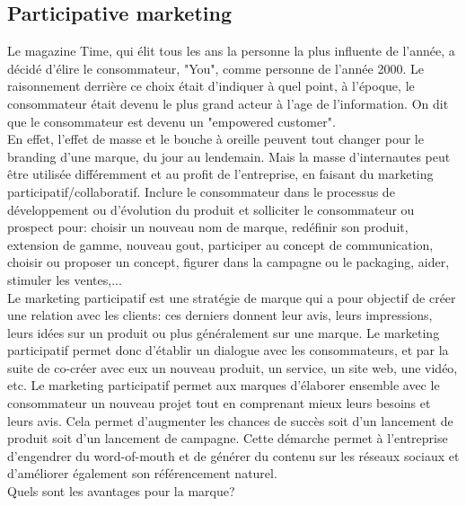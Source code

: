 \vspace{-1.2cm}

\subsection{Participative marketing}

Le magazine Time, qui élit tous les ans la personne la plus influente de l'année, a décidé d'élire le consommateur, "You", comme personne de l'année 2000. Le raisonnement derrière ce choix était d'indiquer à quel point, à l'époque, le consommateur était devenu le plus grand acteur à l'age de l'information. On dit que le consommateur est devenu un "empowered customer".\\

En effet, l'effet de masse et le bouche à oreille peuvent tout changer pour le branding d'une marque, du jour au lendemain. Mais la masse d'internautes peut être utilisée différemment et au profit de l'entreprise, en faisant du marketing participatif/collaboratif. Inclure le consommateur dans le processus de développement ou d'évolution du produit et solliciter le consommateur ou prospect pour: choisir un nouveau nom de marque, redéfinir son produit, extension de gamme, nouveau gout, participer au concept de communication, choisir ou proposer un concept, figurer dans la campagne ou le packaging, aider, stimuler les ventes,...\\

Le marketing participatif est une stratégie de marque qui a pour objectif de créer une relation avec les clients: ces derniers donnent leur avis, leurs impressions, leurs idées sur un produit ou plus généralement sur une marque. Le marketing participatif permet donc d'établir un dialogue avec les consommateurs, et par la suite de co-créer avec eux un nouveau produit, un service, un site web, une vidéo, etc. Le marketing participatif permet aux marques d’élaborer ensemble avec le consommateur un nouveau projet tout en comprenant mieux leurs besoins et leurs avis. Cela permet d’augmenter les chances de succès soit d’un lancement de produit soit d’un lancement de campagne. Cette démarche permet à l’entreprise d’engendrer du word-of-mouth et de générer du contenu sur les réseaux sociaux et d’améliorer également son référencement naturel. \\

Quels sont les avantages pour la marque?

